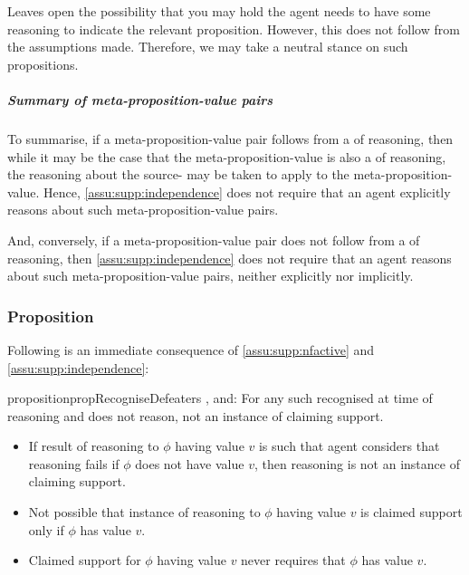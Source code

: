 \begin{note}
  \color{red}
  Leaves open the possibility that you may hold the agent needs to have some reasoning to indicate the relevant proposition.
  However, this does not follow from the assumptions made.
  Therefore, we may take a neutral stance on such propositions.
\end{note}

\subparagraph*{Summary of meta-proposition-value pairs}

\begin{note}
  To summarise, if a meta-proposition-value pair follows from a  of reasoning, then while it may be the case that the meta-proposition-value is also a  of reasoning, the reasoning about the source- may be taken to apply to the meta-proposition-value.
  Hence, \autoref{assu:supp:independence} does not require that an agent explicitly reasons about such meta-proposition-value pairs.

  And, conversely, if a meta-proposition-value pair does not follow from a  of reasoning, then \autoref{assu:supp:independence} does not require that an agent reasons about such meta-proposition-value pairs, neither explicitly nor implicitly.
\end{note}


\subsubsection{Proposition}
\label{sec:proposition}

\begin{note}
  Following is an immediate consequence of \ref{assu:supp:nfactive} and \autoref{assu:supp:independence}:

  \begin{restatable}{proposition}{propRecogniseDefeaters}
    \label{prop:CS-only-if-reason-recognised-defeaters}
    \requ{}, and:
    For any such recognised \requ{} at time of reasoning and does not reason, not an instance of claiming support.
  \end{restatable}
\end{note}

  \begin{note}
  \begin{itemize}
  \item If result of reasoning to \(\phi\) having value \(v\) is such that agent considers that reasoning fails if \(\phi\) does not have value \(v\), then reasoning is not an instance of claiming support.
  \item Not possible that instance of reasoning to \(\phi\) having value \(v\) is claimed support only if \(\phi\) has value \(v\).
  \item Claimed support for \(\phi\) having value \(v\) never requires that \(\phi\) has value \(v\).
  \end{itemize}
\end{note}

